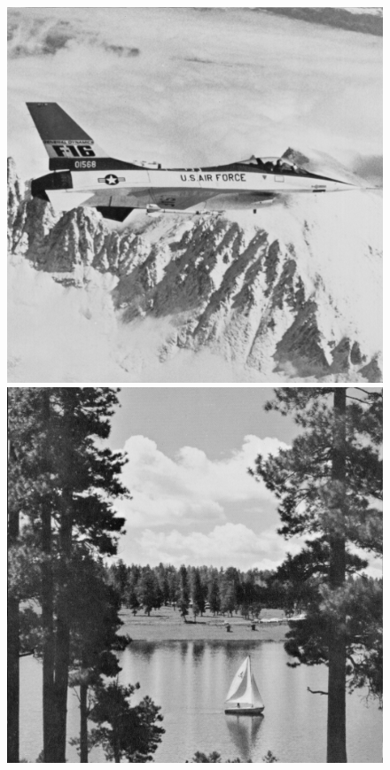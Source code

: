 \begin{figure}[h!]
    \includegraphics[width=\size]{fig/testimages/jetplane.png}\hfill
    \includegraphics[width=\size]{fig/testimages/lake.png}\hfill

\end{figure}
